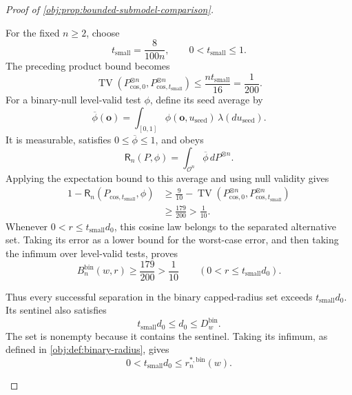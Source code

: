 \begin{proof}[Proof of \cref{obj:prop:bounded-submodel-comparison}]
\begin{enumerate}
For the fixed \(n\ge2\), choose
\[
t_{\mathrm{small}}=\frac8{100n},
\qquad
0<t_{\mathrm{small}}\le1.
\]
The preceding product bound becomes
\[
\operatorname{TV}
\left(
P_{\mathrm{cos},0}^{\otimes n},
P_{\mathrm{cos},t_{\mathrm{small}}}^{\otimes n}
\right)
\le\frac{nt_{\mathrm{small}}}{16}
=\frac1{200}.
\]
For a binary-null level-valid test \(\phi\), define its seed average by
\[
\overline\phi(\boldsymbol o)
=\int_{[0,1]}\phi(\boldsymbol o,u_{\mathrm{seed}})
\,\lambda(du_{\mathrm{seed}}).
\]
It is measurable, satisfies \(0\le\overline\phi\le1\), and obeys
\[
\mathsf R_n(P,\phi)
=\int_{\mathcal O^n}\overline\phi\,dP^{\otimes n}.
\]
Applying the expectation bound to this average and using null validity gives
\[
\begin{split}
1-\mathsf R_n(P_{\mathrm{cos},t_{\mathrm{small}}},\phi)
&\ge
\frac9{10}
-\operatorname{TV}
\left(
P_{\mathrm{cos},0}^{\otimes n},
P_{\mathrm{cos},t_{\mathrm{small}}}^{\otimes n}
\right)\\
&\ge\frac{179}{200}>\frac1{10}.
\end{split}
\]
Whenever \(0<r\le t_{\mathrm{small}}d_0\), this cosine law belongs to the separated alternative set. Taking its error as a lower bound for the worst-case error, and then taking the infimum over level-valid tests, proves
\[
B_n^{\mathrm{bin}}(w,r)\ge\frac{179}{200}>\frac1{10}
\qquad(0<r\le t_{\mathrm{small}}d_0).
\]

Thus every successful separation in the binary capped-radius set exceeds \(t_{\mathrm{small}}d_0\). Its sentinel also satisfies
\[
t_{\mathrm{small}}d_0\le d_0\le D_w^{\mathrm{bin}}.
\]
The set is nonempty because it contains the sentinel. Taking its infimum, as defined in \cref{obj:def:binary-radius}, gives
\[
0<t_{\mathrm{small}}d_0
\le r_n^{*,\mathrm{bin}}(w).
\]


\end{enumerate}
\end{proof}
